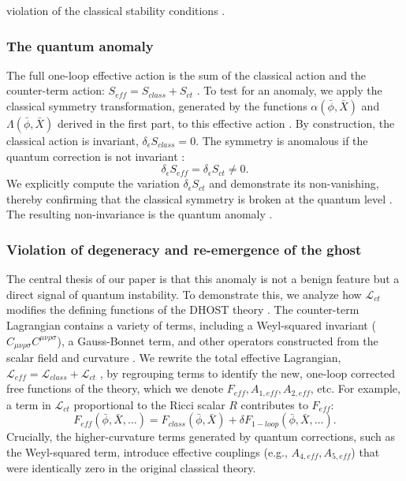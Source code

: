 \documentclass[twocolumn]{aastex631}
\begin{document}
violation of the classical stability conditions  \citep{solera2026symmetryrestoringfinitecountertermssmeft}.\subsubsection{The quantum anomaly}The full one-loop effective action is the sum of the classical action and the counter-term action: $S_{eff} = S_{class} + S_{ct}$ \citep{avramidi1996covariantmethodscalculationeffective,chakrabortty2025loopthermaleffectiveaction}. To test for an anomaly, we apply the classical symmetry transformation, generated by the functions $\alpha(\bar{\phi}, \bar{X})$ and $\Lambda(\bar{\phi}, \bar{X})$ derived in the first part, to this effective action \citep{wetterich2024fieldtransformationsfunctionalintegral}. By construction, the classical action is invariant, $\delta_\epsilon S_{class} = 0$. The symmetry is anomalous if the quantum correction is not invariant \citep{avramidi1996covariantmethodscalculationeffective,chakrabortty2025loopthermaleffectiveaction}:\begin{equation}\delta_\epsilon S_{eff} = \delta_\epsilon S_{ct} \neq 0.\end{equation}We explicitly compute the variation $\delta_\epsilon S_{ct}$ and demonstrate its non-vanishing, thereby confirming that the classical symmetry is broken at the quantum level \citep{coon2002anomaliesquantummechanics1r2,seiberg2025anomalouscontinuoustranslations}. The resulting non-invariance is the quantum anomaly \citep{mauro2005cancellationanomaliespathintegral}.\subsubsection{Violation of degeneracy and re-emergence of the ghost}The central thesis of our paper is that this anomaly is not a benign feature but a direct signal of quantum instability. To demonstrate this, we analyze how $\mathcal{L}_{ct}$ modifies the defining functions of the DHOST theory \citep{gao2019higherderivativescalartensortheory}. The counter-term Lagrangian contains a variety of terms, including a Weyl-squared invariant ($C_{\mu\nu\rho\sigma}C^{\mu\nu\rho\sigma}$), a Gauss-Bonnet term, and other operators constructed from the scalar field and curvature \citep{brandt2022quantumgravitygeneralbackground}. We rewrite the total effective Lagrangian, $\mathcal{L}_{eff} = \mathcal{L}_{class} + \mathcal{L}_{ct}$ \citep{brandt2026equivalencesecondorderformulations}, by regrouping terms to identify the new, one-loop corrected free functions of the theory, which we denote $F_{eff}, A_{1,eff}, A_{2,eff}$, etc. For example, a term in $\mathcal{L}_{ct}$ proportional to the Ricci scalar $R$ contributes to $F_{eff}$:\begin{equation}F_{eff}(\bar{\phi}, \bar{X}, \dots) = F_{class}(\bar{\phi}, \bar{X}) + \delta F_{1-loop}(\bar{\phi}, \bar{X}, \dots).\end{equation}Crucially, the higher-curvature terms generated by quantum corrections, such as the Weyl-squared term, introduce effective couplings (e.g., $A_{4,eff}, A_{5,eff}$) that were identically zero in the original classical theory. 
\end{document}
